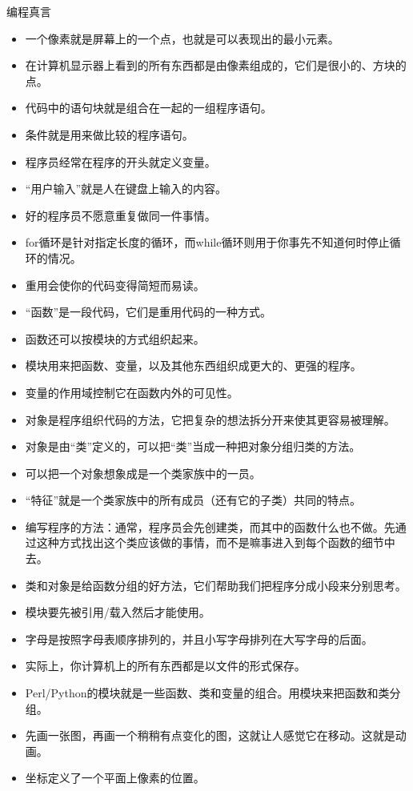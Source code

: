 \begin{frame}
\begin{block}{编程真言}
\begin{itemize}
      \item 一个像素就是屏幕上的一个点，也就是可以表现出的最小元素。
      \item 在计算机显示器上看到的所有东西都是由像素组成的，它们是很小的、方块的点。
      \item 代码中的语句块就是组合在一起的一组程序语句。
      \item 条件就是用来做比较的程序语句。
      \item 程序员经常在程序的开头就定义变量。
      \item “用户输入”就是人在键盘上输入的内容。
      \item 好的程序员不愿意重复做同一件事情。
      \item for循环是针对指定长度的循环，而while循环则用于你事先不知道何时停止循环的情况。
      \item 重用会使你的代码变得简短而易读。
      \item “函数”是一段代码，它们是重用代码的一种方式。
      \item 函数还可以按模块的方式组织起来。
      \item 模块用来把函数、变量，以及其他东西组织成更大的、更强的程序。
      \item 变量的作用域控制它在函数内外的可见性。
      \item 对象是程序组织代码的方法，它把复杂的想法拆分开来使其更容易被理解。
      \item 对象是由“类”定义的，可以把“类”当成一种把对象分组归类的方法。
      \item 可以把一个对象想象成是一个类家族中的一员。
      \item “特征”就是一个类家族中的所有成员（还有它的子类）共同的特点。
      \item 编写程序的方法：通常，程序员会先创建类，而其中的函数什么也不做。先通过这种方式找出这个类应该做的事情，而不是嘛事进入到每个函数的细节中去。
      \item 类和对象是给函数分组的好方法，它们帮助我们把程序分成小段来分别思考。
      \item 模块要先被引用/载入然后才能使用。
      \item 字母是按照字母表顺序排列的，并且小写字母排列在大写字母的后面。
      \item 实际上，你计算机上的所有东西都是以文件的形式保存。
      \item Perl/Python的模块就是一些函数、类和变量的组合。用模块来把函数和类分组。
      \item 先画一张图，再画一个稍稍有点变化的图，这就让人感觉它在移动。这就是动画。
      \item 坐标定义了一个平面上像素的位置。

\end{itemize}
\end{block}
\end{frame}
